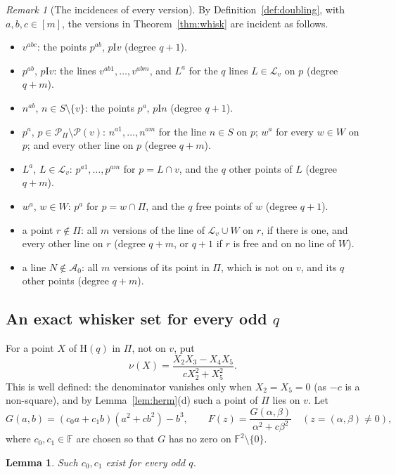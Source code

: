 \documentclass[11pt]{amsart}
\newtheorem{lemma}[theorem]{Lemma}
\theoremstyle{definition}
\theoremstyle{remark}
\newtheorem{remark}[theorem]{Remark}
\newcommand{\cP}{\mathcal{P}}
\newcommand{\cL}{\mathcal{L}}
\newcommand{\cA}{\mathcal{A}}
\newcommand{\I}{\mathrel{\mathrm{I}}}
\newcommand{\F}{\mathbb{F}}
\newcommand{\Hq}{\mathrm{H}}
\begin{document}
\begin{remark}[The incidences of every version]\label{rem:versions}
By Definition~\ref{def:doubling}, with $a,b,c\in[m]$, the versions in Theorem~\ref{thm:whisk} are incident as follows.
\begin{itemize}[leftmargin=1.5em]
\item $v^{abc}$: the points $p^{ab}$, $p\I v$ (degree $q+1$).
\item $p^{ab}$, $p\I v$: the lines $v^{ab1},\dots,v^{abm}$, and $L^a$ for the $q$ lines $L\in\cL_v$ on $p$ (degree $q+m$).
\item $n^{ab}$, $n\in S\setminus\{v\}$: the points $p^a$, $p\I n$ (degree $q+1$).
\item $p^a$, $p\in\cP_\Pi\setminus\cP(v)$: $n^{a1},\dots,n^{am}$ for the line $n\in S$ on $p$; $w^a$ for every $w\in W$ on $p$; and every other line on $p$ (degree $q+m$).
\item $L^a$, $L\in\cL_v$: $p^{a1},\dots,p^{am}$ for $p=L\cap v$, and the $q$ other points of $L$ (degree $q+m$).
\item $w^a$, $w\in W$: $p^a$ for $p=w\cap\Pi$, and the $q$ free points of $w$ (degree $q+1$).
\item a point $r\notin\Pi$: all $m$ versions of the line of $\cL_v\cup W$ on $r$, if there is one, and every other line on $r$ (degree $q+m$, or $q+1$ if $r$ is free and on no line of $W$).
\item a line $N\notin\cA_0$: all $m$ versions of its point in $\Pi$, which is not on $v$, and its $q$ other points (degree $q+m$).
\end{itemize}
\end{remark}

\subsection{An exact whisker set for every odd \texorpdfstring{$q$}{q}}\label{sec:exactodd}
For a point $X$ of $\Hq(q)$ in $\Pi$, not on $v$, put
\[
\nu(X)=\frac{X_2X_3-X_4X_5}{cX_2^2+X_5^2}.
\]
This is well defined: the denominator vanishes only when $X_2=X_5=0$ (as $-c$ is a non-square), and by Lemma~\ref{lem:herm}(d) such a point of $\Pi$ lies on $v$. Let
\[
G(a,b)=(c_0a+c_1b)(a^2+cb^2)-b^3,\qquad F(z)=\frac{G(\alpha,\beta)}{\alpha^2+c\beta^2}\quad(z=(\alpha,\beta)\ne0),
\]
where $c_0,c_1\in\F$ are chosen so that $G$ has no zero on $\F^2\setminus\{0\}$.

\begin{lemma}\label{lem:G}
Such $c_0,c_1$ exist for every odd $q$.
\end{lemma}
\end{document}
